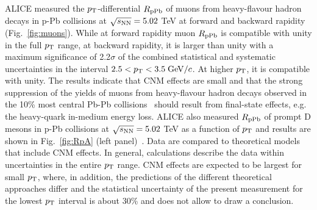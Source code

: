 ALICE measured the $p_{\rm T}$-differential $R_{\rm pPb}$ of muons from heavy-flavour hadron decays in p-Pb collisions at $\sqrt{s_{\rm NN}} = 5.02$ TeV
at forward and backward rapidity~\cite{Acharya:2017hdv} (Fig.~\ref{fig:muons}).
While at forward rapidity muon $R_{\rm pPb}$ is compatible with unity in the full $p_{\rm T}$ range, 
at backward rapidity, it is larger than unity with a maximum 
significance of 2.2$\sigma$ of the combined statistical and systematic uncertainties in the interval $2.5 < p_{\rm T} < 3.5 \;\mathrm{GeV}/c$. 
At higher $p_{\rm T}$, it is compatible with unity. The results indicate
that CNM effects are small and that the strong suppression of the
yields of muons from heavy-flavour hadron decays observed in the
10\% most central Pb-Pb collisions~\cite{Abelev:2012qh} should result from final-state
effects, e.g. the heavy-quark in-medium energy loss. 
ALICE also measured $R_{\rm pPb}$ of prompt D mesons in p-Pb collisions at $\sqrt{s_{\rm NN}} = 5.02$ TeV
as a function of $p_{\rm T}$ and results are shown in Fig.~\ref{fig:RpA} (left panel)~\cite{ALICEPAS2017008}. Data are compared to 
theoretical models that include CNM effects. In general, calculations describe the data within 
uncertainties in the entire $p_{\rm T}$ range. CNM effects are expected to be largest for small $p_{\rm T}$, 
where, in addition, the predictions of the different theoretical approaches differ and the statistical 
uncertainty of the present measurement for the lowest $p_{\rm T}$ interval is about 30\% and does not 
allow to draw a conclusion. \\

